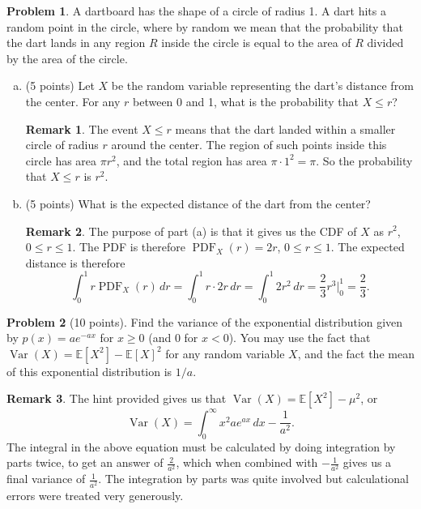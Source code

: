 \documentclass[11pt,oneside]{amsart}
\theoremstyle{definition}
\newtheorem{problem}{Problem}
\newtheorem*{remark}{Remark}
\newcommand{\bE}{\mathbb{E}}
\DeclareMathOperator{\Var}{Var}
\DeclareMathOperator{\PDF}{PDF}
\begin{document}
\begin{problem}
A dartboard has the shape of a circle of radius 1. A dart hits a random point in the circle, where by random we mean that the probability that the dart lands in any region $R$ inside the circle is equal to the area of $R$ divided by the area of the circle.
\begin{enumerate}[(a)]
  \item (5 points) Let $X$ be the random variable representing the dart's distance from the center. For any $r$ between 0 and 1, what is the probability that $X\leq r$?
        \begin{remark}
          The event $X\leq r$ means that the dart landed within a smaller circle of radius $r$ around the center. The region of such points inside this circle has area $\pi r^2$, and the total region has area $\pi\cdot 1^2=\pi$. So the probability that $X\leq r$ is $r^2$.
        \end{remark}
        \vfill
  \item (5 points) What is the expected distance of the dart from the center?
        \begin{remark}
          The purpose of part (a) is that it gives us the CDF of $X$ as $r^2$, $0\leq r\leq 1$. The PDF is therefore $\PDF_X(r)=2r$, $0\leq r\leq 1$. The expected distance is therefore
          \[\int_0^1 r\PDF_X(r)\,dr=\int_0^1 r\cdot 2r\,dr=\int_0^1 2r^2\,dr=\frac 23r^3\Big|_0^1=\frac 23.\]
        \end{remark}
        \vfill
\end{enumerate}
\end{problem}

\newpage

\begin{problem}[10 points]
Find the variance of the exponential distribution given by $p(x)=ae^{-ax}$ for $x\geq 0$ (and 0 for $x<0$). You may use the fact that $\Var(X)=\bE[X^2]-\bE[X]^2$ for any random variable $X$, and the fact the mean of this exponential distribution is $1/a$.
\end{problem}
\begin{remark}
  The hint provided gives us that $\Var(X)=\bE[X^2]-\mu^2$, or
  \[\Var(X)=\int_0^\infty x^2 ae^{ax}\,dx-\frac 1{a^2}.\]
  The integral in the above equation must be calculated by doing integration by parts twice, to get an answer of $\frac 2{a^2}$, which when combined with $-\frac 1{a^2}$ gives us a final variance of $\frac 1{a^2}$. The integration by parts was quite involved but calculational errors were treated very generously.
\end{remark}
\end{document}
